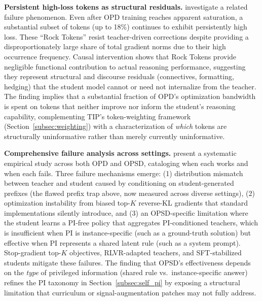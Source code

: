 \documentclass{article} %
\begin{document}
\textbf{Persistent high-loss tokens as structural residuals.} \citet{2605.09253} investigate a related failure phenomenon. Even after OPD training reaches apparent saturation, a substantial subset of tokens (up to 18\%) continues to exhibit persistently high loss. These ``Rock Tokens'' resist teacher-driven corrections despite providing a disproportionately large share of total gradient norms due to their high occurrence frequency. Causal intervention shows that Rock Tokens provide negligible functional contribution to actual reasoning performance, suggesting they represent structural and discourse residuals (connectives, formatting, hedging) that the student model cannot or need not internalize from the teacher. The finding implies that a substantial fraction of OPD's optimization bandwidth is spent on tokens that neither improve nor inform the student's reasoning capability, complementing TIP's token-weighting framework (Section~\ref{subsec:weighting}) with a characterization of \emph{which} tokens are structurally uninformative rather than merely currently uninformative.

\textbf{Comprehensive failure analysis across settings.} \citet{2605.11182} present a systematic empirical study across both OPD and OPSD, cataloging when each works and when each fails. Three failure mechanisms emerge: (1) distribution mismatch between teacher and student caused by conditioning on student-generated prefixes (the flawed prefix trap above, now measured across diverse settings), (2) optimization instability from biased top-$K$ reverse-KL gradients that standard implementations silently introduce, and (3) an OPSD-specific limitation where the student learns a PI-free policy that aggregates PI-conditioned teachers, which is insufficient when PI is instance-specific (such as a ground-truth solution) but effective when PI represents a shared latent rule (such as a system prompt). Stop-gradient top-$K$ objectives, RLVR-adapted teachers, and SFT-stabilized students mitigate these failures. The finding that OPSD's effectiveness depends on the \emph{type} of privileged information (shared rule vs.\ instance-specific answer) refines the PI taxonomy in Section~\ref{subsec:self_pi} by exposing a structural limitation that curriculum or signal-augmentation patches may not fully address.
\end{document}
